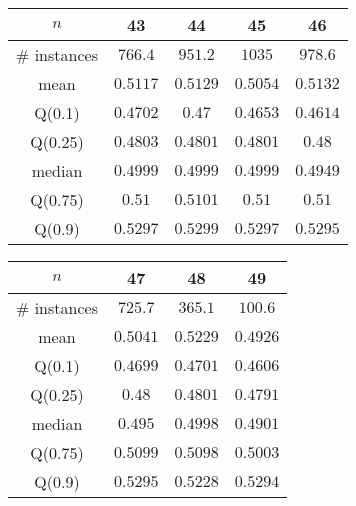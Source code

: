 \begin{tabular}{c|cccc} 
\hline 
$n$ & 43 & 44 & 45 & 46 \tabularnewline 
\hline 
\hline 
\# instances & $766.4$ & $951.2$ & $1035$ & $978.6$ \tabularnewline 
mean & $0.5117$ & $0.5129$ & $0.5054$ & $0.5132$ \tabularnewline 
Q(0.1) & $0.4702$ & $0.47$ & $0.4653$ & $0.4614$ \tabularnewline 
Q(0.25) & $0.4803$ & $0.4801$ & $0.4801$ & $0.48$ \tabularnewline 
median & $0.4999$ & $0.4999$ & $0.4999$ & $0.4949$ \tabularnewline 
Q(0.75) & $0.51$ & $0.5101$ & $0.51$ & $0.51$ \tabularnewline 
Q(0.9) & $0.5297$ & $0.5299$ & $0.5297$ & $0.5295$ \tabularnewline 
\hline 
\end{tabular} 
\medskip{} 

\begin{tabular}{c|ccc} 
\hline 
$n$ & 47 & 48 & 49 \tabularnewline 
\hline 
\hline 
\# instances & $725.7$ & $365.1$ & $100.6$ \tabularnewline 
mean & $0.5041$ & $0.5229$ & $0.4926$ \tabularnewline 
Q(0.1) & $0.4699$ & $0.4701$ & $0.4606$ \tabularnewline 
Q(0.25) & $0.48$ & $0.4801$ & $0.4791$ \tabularnewline 
median & $0.495$ & $0.4998$ & $0.4901$ \tabularnewline 
Q(0.75) & $0.5099$ & $0.5098$ & $0.5003$ \tabularnewline 
Q(0.9) & $0.5295$ & $0.5228$ & $0.5294$ \tabularnewline 
\hline 
\end{tabular} 
\medskip{} 

